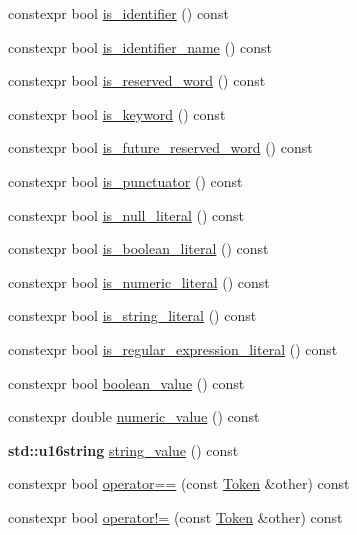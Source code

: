 \begin{DoxyCompactItemize}
\item 
constexpr bool \hyperlink{class_token_a2a0f46fcb0c3e59b30e99739ff948fca}{is\+\_\+identifier} () const
\item 
constexpr bool \hyperlink{class_token_a93c80aa20d87a2bc8111a77507e9b582}{is\+\_\+identifier\+\_\+name} () const
\item 
constexpr bool \hyperlink{class_token_ae87de0ad9832e1799e0ea15179b6abb5}{is\+\_\+reserved\+\_\+word} () const
\item 
constexpr bool \hyperlink{class_token_a032c6c9570a68d806f22b679ebe0f59a}{is\+\_\+keyword} () const
\item 
constexpr bool \hyperlink{class_token_a67a50656bf4d9044c6c792b4eadc5e54}{is\+\_\+future\+\_\+reserved\+\_\+word} () const
\item 
constexpr bool \hyperlink{class_token_aa586e77fafbd1e26f8d18c0d77a63668}{is\+\_\+punctuator} () const
\item 
constexpr bool \hyperlink{class_token_a6f797ec295dfd9bd23ec1c044b577471}{is\+\_\+null\+\_\+literal} () const
\item 
constexpr bool \hyperlink{class_token_a296a03d064fa381593ac2af270739859}{is\+\_\+boolean\+\_\+literal} () const
\item 
constexpr bool \hyperlink{class_token_ad4e192a87a7d5d8d091e57a02120a740}{is\+\_\+numeric\+\_\+literal} () const
\item 
constexpr bool \hyperlink{class_token_a177fc1cf8c4956570fbe74e3b93507b5}{is\+\_\+string\+\_\+literal} () const
\item 
constexpr bool \hyperlink{class_token_a2c605d6a7e47d943570189422875d39a}{is\+\_\+regular\+\_\+expression\+\_\+literal} () const
\item 
constexpr bool \hyperlink{class_token_a72e4ccf32f393af43e08e7ff04e45f95}{boolean\+\_\+value} () const
\item 
constexpr double \hyperlink{class_token_aae9aebc462c07a05b14bf04de8416205}{numeric\+\_\+value} () const
\item 
\textbf{ std\+::u16string} \hyperlink{class_token_a33ae55bb14a681a6e5ab1e4abc36ca86}{string\+\_\+value} () const
\item 
constexpr bool \hyperlink{class_token_a12cec3cf4221ac78a43b9c06e0ae6e8b}{operator==} (const \hyperlink{class_token}{Token} \&other) const
\item 
constexpr bool \hyperlink{class_token_a0d5bdba8b67c466181c0dbc1565ac743}{operator!=} (const \hyperlink{class_token}{Token} \&other) const
\item 

\end{DoxyCompactItemize}
